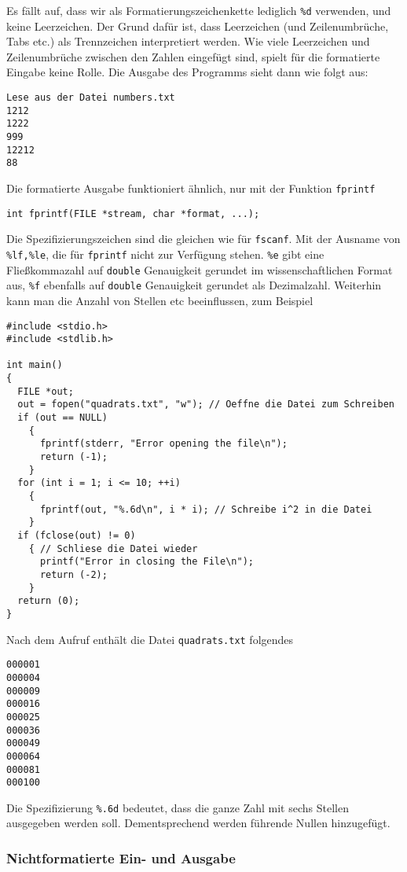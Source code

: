 Es fällt auf, dass wir als Formatierungszeichenkette lediglich \verb|%d| verwenden, und keine Leerzeichen.
Der Grund dafür ist, dass Leerzeichen (und Zeilenumbrüche, Tabs etc.) als Trennzeichen interpretiert werden.
Wie viele Leerzeichen und Zeilenumbrüche zwischen den Zahlen eingefügt sind, spielt für die formatierte Eingabe keine Rolle.
Die Ausgabe des Programms sieht dann wie folgt aus:
\begin{verbatim}
Lese aus der Datei numbers.txt
1212
1222
999
12212
88
\end{verbatim}
Die formatierte Ausgabe funktioniert ähnlich, nur mit der Funktion \verb|fprintf|
\begin{lstlisting}
int fprintf(FILE *stream, char *format, ...);
\end{lstlisting}
Die Spezifizierungszeichen sind die gleichen wie für \verb|fscanf|.
Mit der Ausname von \verb|%lf,%le|, die für \verb|fprintf| nicht zur Verfügung stehen.
\verb|%e| gibt eine Fließkommazahl auf \verb|double| Genauigkeit gerundet im wissenschaftlichen Format aus, \verb|%f| ebenfalls auf \verb|double| Genauigkeit gerundet als Dezimalzahl.
Weiterhin kann man die Anzahl von Stellen etc beeinflussen, zum Beispiel
\begin{lstlisting}
#include <stdio.h>
#include <stdlib.h>

int main()
{
  FILE *out;
  out = fopen("quadrats.txt", "w"); // Oeffne die Datei zum Schreiben
  if (out == NULL)
    {
      fprintf(stderr, "Error opening the file\n");
      return (-1);
    }
  for (int i = 1; i <= 10; ++i)
    {
      fprintf(out, "%.6d\n", i * i); // Schreibe i^2 in die Datei
    }
  if (fclose(out) != 0)
    { // Schliese die Datei wieder
      printf("Error in closing the File\n");
      return (-2);
    }
  return (0);
}
\end{lstlisting}
Nach dem Aufruf enthält die Datei \verb|quadrats.txt| folgendes
\begin{verbatim}
000001
000004
000009
000016
000025
000036
000049
000064
000081
000100
\end{verbatim}
Die Spezifizierung \verb|%.6d| bedeutet, dass die ganze Zahl mit sechs Stellen ausgegeben werden soll.
Dementsprechend werden führende Nullen hinzugefügt.

\subsubsection{Nichtformatierte Ein- und Ausgabe}

